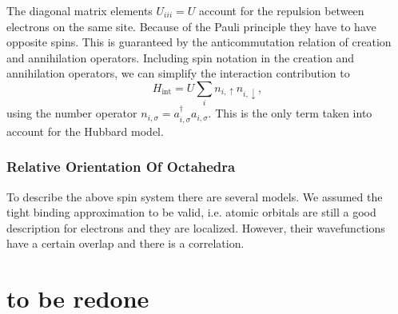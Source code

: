 \documentclass[a4paper,10pt]{report}
\begin{document}
The diagonal matrix elements $U_{iii} = U$ account for the repulsion between electrons on the same site. 
Because of the Pauli principle they have to have opposite spins. This is guaranteed by the anticommutation relation of creation and annihilation operators.
Including spin notation in the creation and annihilation operators, we can simplify the interaction contribution to 
\begin{equation}
 H_{\text{int}} = U \sum_i n_{i,\uparrow} n_{i,\downarrow},
\end{equation}
using the number operator $n_{i,\sigma} = a^{\dagger}_{i,\sigma} a_{i,\sigma}$.
This is the only term taken into account for the Hubbard model.











\subsubsection{Relative Orientation Of Octahedra}




To describe the above spin system there are several models. We assumed the tight binding approximation to be valid, i.e. atomic orbitals
are still a good description for electrons and they are localized. However, their wavefunctions have a certain overlap and there is a correlation. 

\section{to be redone}
\end{document}
